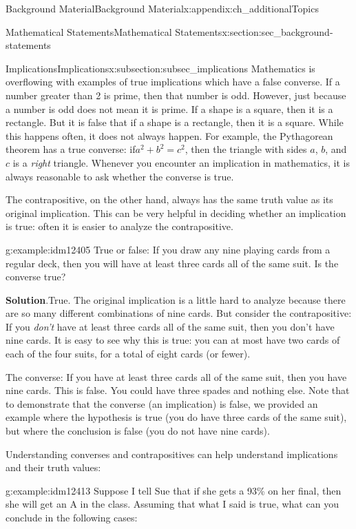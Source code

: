 \documentclass[oneside,10pt,]{book}
\numberwithin{equation}{chapter}
\begin{document}
\begin{appendixptx}{Background Material}{}{Background Material}{}{}{x:appendix:ch_additionalTopics}
\begin{sectionptx}{Mathematical Statements}{}{Mathematical Statements}{}{}{x:section:sec_background-statements}
\begin{subsectionptx}{Implications}{}{Implications}{}{}{x:subsection:subsec_implications}
Mathematics is overflowing with examples of true implications which have a false converse. If a number greater than 2 is prime, then that number is odd. However, just because a number is odd does not mean it is prime. If a shape is a square, then it is a rectangle. But it is false that if a shape is a rectangle, then it is a square. While this happens often, it does not always happen. For example, the Pythagorean theorem has a true converse: if\(a^2 + b^2 = c^2\), then the triangle with sides \(a\), \(b\), and \(c\) is a \emph{right} triangle. Whenever you encounter an implication in mathematics, it is always reasonable to ask whether the converse is true.%
\par
The contrapositive, on the other hand, always has the same truth value as its original implication. This can be very helpful in deciding whether an implication is true: often it is easier to analyze the contrapositive.%
\begin{example}{}{g:example:idm12405}%
True or false: If you draw any nine playing cards from a regular deck, then you will have at least three cards all of the same suit. Is the converse true?%
\par\smallskip%
\noindent\textbf{Solution}.\hypertarget{g:solution:idm12408}{}\quad{}True. The original implication is a little hard to analyze because there are so many different combinations of nine cards. But consider the contrapositive: If you \emph{don't} have at least three cards all of the same suit, then you don't have nine cards. It is easy to see why this is true: you can at most have two cards of each of the four suits, for a total of eight cards (or fewer).%
\par
The converse: If you have at least three cards all of the same suit, then you have nine cards. This is false. You could have three spades and nothing else. Note that to demonstrate that the converse (an implication) is false, we provided an example where the hypothesis is true (you do have three cards of the same suit), but where the conclusion is false (you do not have nine cards).%
\end{example}
Understanding converses and contrapositives can help understand implications and their truth values:%
\begin{example}{}{g:example:idm12413}%
Suppose I tell Sue that if she gets a 93\% on her final, then she will get an A in the class. Assuming that what I said is true, what can you conclude in the following cases:%
\par
%
\begin{enumerate}

\end{enumerate}
\end{example}
\end{subsectionptx}
\end{sectionptx}
\end{appendixptx}
\end{document}
